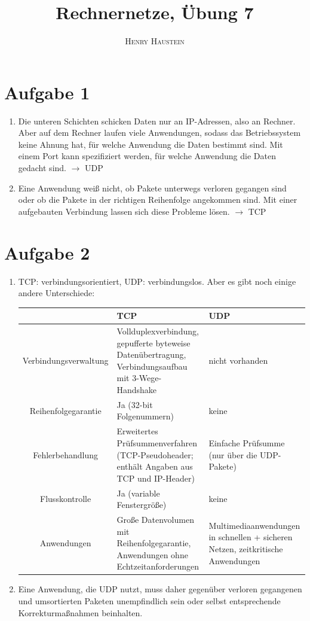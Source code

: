 \documentclass{article}
\title{\textbf{Rechnernetze, Übung 7}}
\author{\textsc{Henry Haustein}}
\date{}
\begin{document}
	\maketitle
	
	\section*{Aufgabe 1}
	\begin{enumerate}[label=(\alph*)]
		\item Die unteren Schichten schicken Daten nur an IP-Adressen, also an Rechner. Aber auf dem Rechner laufen viele Anwendungen, sodass das Betriebssystem keine Ahnung hat, für welche Anwendung die Daten bestimmt sind. Mit einem Port kann spezifiziert werden, für welche Anwendung die Daten gedacht sind. $\to$ UDP
		\item Eine Anwendung weiß nicht, ob Pakete unterwegs verloren gegangen sind oder ob die Pakete in der richtigen Reihenfolge angekommen sind. Mit einer aufgebauten Verbindung lassen sich diese Probleme lösen. $\to$ TCP
	\end{enumerate}

	\section*{Aufgabe 2}
	\begin{enumerate}[label=(\alph*)]
		\item TCP: verbindungsorientiert, UDP: verbindungslos. Aber es gibt noch einige andere Unterschiede:
		\begin{center}
			\begin{tabular}{c|C{5cm}|C{5cm}}
				& \textbf{TCP} & \textbf{UDP} \\
				\hline
				Verbindungsverwaltung & Vollduplexverbindung, gepufferte byteweise Datenübertragung, Verbindungsaufbau mit 3-Wege-Handshake & nicht vorhanden \\
				\hline
				Reihenfolgegarantie & Ja (32-bit Folgenummern) & keine \\
				\hline
				Fehlerbehandlung & Erweitertes Prüfsummenverfahren (TCP-Pseudoheader; enthält Angaben aus TCP und IP-Header) & Einfache Prüfsumme (nur über die UDP-Pakete) \\
				\hline
				Flusskontrolle & Ja (variable Fenstergröße) & keine \\
				\hline
				Anwendungen & Große Datenvolumen mit Reihenfolgegarantie, Anwendungen ohne Echtzeitanforderungen & Multimediaanwendungen in schnellen + sicheren Netzen, zeitkritische Anwendungen
			\end{tabular}
		\end{center}
		\item Eine Anwendung, die UDP nutzt, muss daher gegenüber verloren gegangenen und umsortierten Paketen unempfindlich sein oder selbst entsprechende Korrekturmaßnahmen beinhalten. 
	\end{enumerate}
\end{document}
